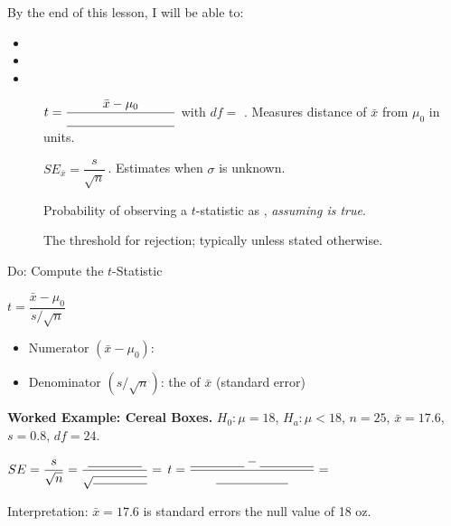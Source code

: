 \documentclass[10pt]{article}
\begin{document}
\namedateperiod

\vspace{0.15in}

\begin{objectivebox}
By the end of this lesson, I will be able to:
\begin{itemize}
  \item \writeline
  \item \writeline
  \item \writeline
\end{itemize}
\end{objectivebox}

\begin{vocabbox}
\begin{description}
  \item[]
        $t = \dfrac{\bar x - \mu_0}{\blank{3cm}}$ \quad with $df = $ \blank{2cm}. \quad
        Measures distance of $\bar x$ from $\mu_0$ in \blank{4cm} units.
  \item[]
        $SE_{\bar x} = \dfrac{s}{\sqrt{n}}$\,. \quad Estimates \blank{3cm} when $\sigma$ is unknown.
  \item[]
        Probability of observing a $t$-statistic as \blank{7cm},
        \emph{assuming \blank{3cm} is true}.
  \item[]
        The threshold for rejection; typically \blank{1.5cm} unless stated otherwise.
\end{description}
\end{vocabbox}

\begin{notesbox}{Do: Compute the $t$-Statistic}
\begin{center}
  $t = \dfrac{\bar x - \mu_0}{s / \sqrt{n}}$
\end{center}

\begin{itemize}
  \item Numerator $(\bar x - \mu_0)$: \blank{8cm}
  \item Denominator $(s/\sqrt{n})$: the \blank{5cm} of $\bar x$ (standard error)
\end{itemize}

\medskip
\textbf{Worked Example: Cereal Boxes.}
$H_0: \mu = 18$, $H_a: \mu < 18$, $n = 25$, $\bar x = 17.6$, $s = 0.8$, $df = 24$.

\medskip
$SE = \dfrac{s}{\sqrt{n}} = \dfrac{\blank{1.5cm}}{\sqrt{\blank{1.5cm}}} = $ \blank{2cm}
\hfill
$t = \dfrac{\blank{1.5cm} - \blank{1.5cm}}{\blank{2cm}} = $ \blank{2cm}

Interpretation: $\bar x = 17.6$ is \blank{2cm} standard errors \blank{2cm} the null value of 18 oz.
\end{notesbox}
\end{document}
